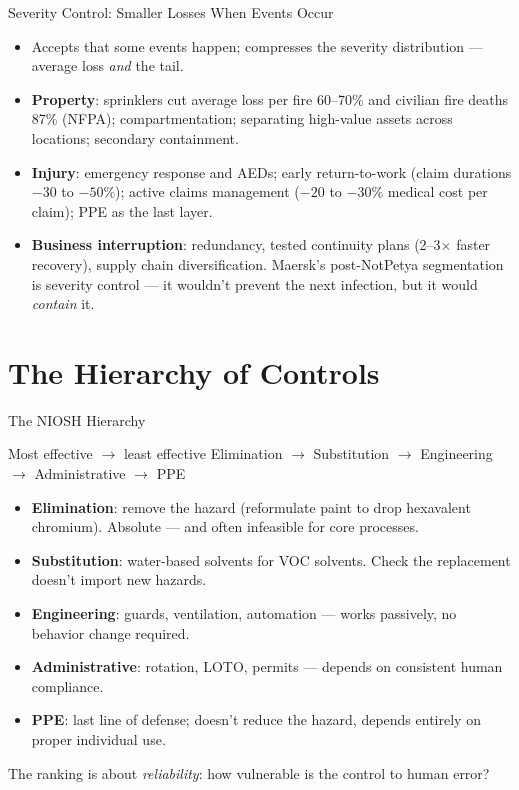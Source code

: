 \documentclass[11pt, aspectratio=169]{beamer}
\begin{document}
\begin{frame}{Severity Control: Smaller Losses When Events Occur}
\begin{itemize}
  \item Accepts that some events happen; compresses the severity distribution --- average loss \emph{and} the tail.
  \item \textbf{Property}: sprinklers cut average loss per fire 60--70\% and civilian fire deaths 87\% (NFPA); compartmentation; separating high-value assets across locations; secondary containment.
  \item \textbf{Injury}: emergency response and AEDs; early return-to-work (claim durations $-30$ to $-50\%$); active claims management ($-20$ to $-30\%$ medical cost per claim); PPE as the last layer.
  \item \textbf{Business interruption}: redundancy, tested continuity plans (2--3$\times$ faster recovery), supply chain diversification. Maersk's post-NotPetya segmentation is severity control --- it wouldn't prevent the next infection, but it would \emph{contain} it.
\end{itemize}
\end{frame}

\section{The Hierarchy of Controls}

\begin{frame}{The NIOSH Hierarchy}
\begin{block}{Most effective $\rightarrow$ least effective}
\alert{Elimination} $\rightarrow$ \alert{Substitution} $\rightarrow$ \alert{Engineering} $\rightarrow$ \alert{Administrative} $\rightarrow$ \alert{PPE}
\end{block}
\medskip
\begin{itemize}
  \item \textbf{Elimination}: remove the hazard (reformulate paint to drop hexavalent chromium). Absolute --- and often infeasible for core processes.
  \item \textbf{Substitution}: water-based solvents for VOC solvents. Check the replacement doesn't import new hazards.
  \item \textbf{Engineering}: guards, ventilation, automation --- works passively, no behavior change required.
  \item \textbf{Administrative}: rotation, LOTO, permits --- depends on consistent human compliance.
  \item \textbf{PPE}: last line of defense; doesn't reduce the hazard, depends entirely on proper individual use.
\end{itemize}
\medskip
The ranking is about \emph{reliability}: how vulnerable is the control to human error?
\end{frame}
\end{document}
